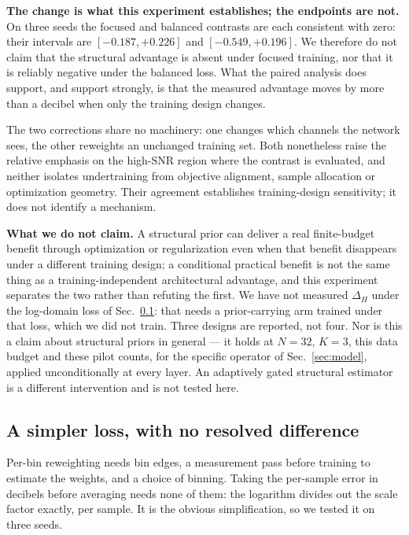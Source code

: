 \documentclass[journal]{IEEEtran}
\begin{document}
\textbf{The change is what this experiment establishes; the endpoints are
not.} On three seeds the focused and balanced contrasts are each consistent
with zero: their intervals are $[-0.187,+0.226]$ and $[-0.549,+0.196]$. We
therefore do not claim that the structural advantage is absent under focused
training, nor that it is reliably negative under the balanced loss. What the
paired analysis does support, and support strongly, is that the measured
advantage moves by more than a decibel when only the training design changes.

The two corrections share no machinery: one changes which channels the network
sees, the other reweights an unchanged training set. Both nonetheless raise the
relative emphasis on the high-SNR region where the contrast is evaluated, and
neither isolates undertraining from objective alignment, sample allocation or
optimization geometry. Their agreement establishes training-design sensitivity;
it does not identify a mechanism.

\textbf{What we do not claim.} A structural prior can deliver a real
finite-budget benefit through optimization or regularization even when that
benefit disappears under a different training design; a conditional practical
benefit is not the same thing as a training-independent architectural
advantage, and this experiment separates the two rather than refuting the
first. We have not measured $\Delta_H$ under the log-domain loss of
Sec.~\ref{sec:logloss}: that needs a prior-carrying arm trained under that
loss, which we did not train. Three designs are reported, not four. Nor is this
a claim about structural priors in general --- it holds at $N=32$, $K=3$, this
data budget and these pilot counts, for the specific operator of
Sec.~\ref{sec:model}, applied unconditionally at every layer. An adaptively
gated structural estimator is a different intervention and is not tested
here.

\subsection{A simpler loss, with no resolved difference}
\label{sec:logloss}

Per-bin reweighting needs bin edges, a measurement pass before training to
estimate the weights, and a choice of binning. Taking the per-sample error in
decibels before averaging needs none of them: the logarithm divides out the
scale factor exactly, per sample. It is the obvious simplification, so we
tested it on three seeds.
\end{document}
